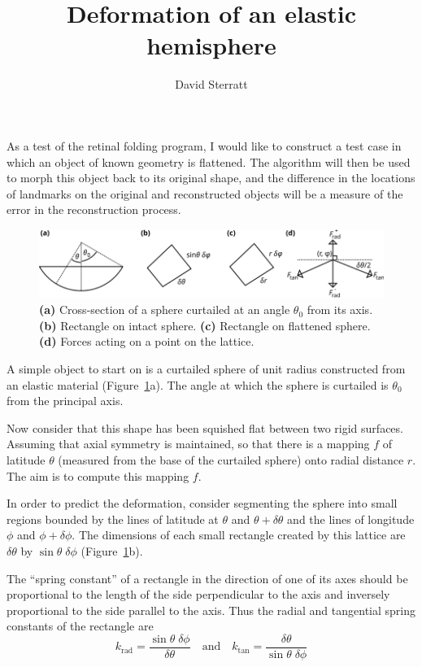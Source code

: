 \documentclass{article}
\title{Deformation of an elastic hemisphere}
\author{David Sterratt}
\newcommand{\figref}[1]{\textbf{(#1)}}
\begin{document}
\maketitle
\thispagestyle{myheadings}

As a test of the retinal folding program, I would like to construct a
test case in which an object of known geometry is flattened. The
algorithm will then be used to morph this object back to its original
shape, and the difference in the locations of landmarks on the
original and reconstructed objects will be a measure of the error in
the reconstruction process.

\begin{figure}[h]
  \centering
  \includegraphics{hemisphere}
  \caption{\figref{a} Cross-section of a sphere curtailed at an angle
    $\theta_0$ from its axis. \figref{b} Rectangle on intact
    sphere. \figref{c} Rectangle on flattened sphere. \figref{d}
    Forces acting on a point on the lattice.}
  \label{deformation:fig:hemisphere}
\end{figure}

A simple object to start on is a curtailed sphere of unit radius
constructed from an elastic material
(Figure~\ref{deformation:fig:hemisphere}a). The angle at which the
sphere is curtailed is $\theta_0$ from the principal axis.

Now consider that this shape has been squished flat between two rigid
surfaces. Assuming that axial symmetry is maintained, so that there is
a mapping $f$ of latitude $\theta$ (measured from the base of the
curtailed sphere) onto radial distance $r$.  The aim is to compute
this mapping $f$.

In order to predict the deformation, consider segmenting the sphere
into small regions bounded by the lines of latitude at $\theta$ and
$\theta+\delta\theta$ and the lines of longitude $\phi$ and
$\phi+\delta\phi$. The dimensions of each small rectangle created by
this lattice are $\delta\theta$ by $\sin\theta\;\delta\phi$
(Figure~\ref{deformation:fig:hemisphere}b).

The ``spring constant'' of a rectangle in the direction of one of its
axes should be proportional to the length of the side perpendicular to
the axis and inversely proportional to the side parallel to the
axis. Thus the radial and tangential spring constants of the rectangle are
\begin{equation}
\label{deformation:eq:1}
  k_\mathrm{rad} = \frac{\sin\theta\;\delta\phi}{\delta\theta}
  \quad\mbox{and}\quad
  k_\mathrm{tan} = \frac{\delta\theta}{\sin\theta\;\delta\phi}
\end{equation}
\end{document}
